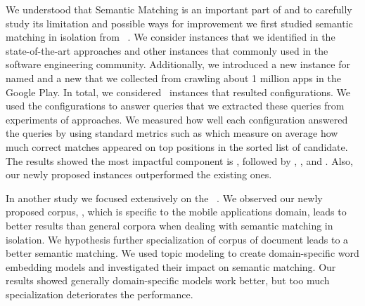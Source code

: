 \bigskip
We understood that Semantic Matching is an important part of \testreuse and to carefully study its limitation and possible ways for improvement we first studied semantic matching in isolation from \testreuse~\cite{mariani:SemFinder:ISSTA:2021}.  
We consider instances that we identified in the state-of-the-art \testreuse approaches and other instances that commonly used in the software engineering community. 
Additionally, we introduced a new instance for \sma named \tool and a new \corpus that we collected from crawling about 1 million apps in the Google Play.
In total, we considered \ninstances~instances that resulted \ncomb configurations.
We used the configurations to answer \nquery queries that we extracted these queries from experiments of \testreuse approaches.
We measured how well each configuration answered the queries by using standard metrics such as \mrr which measure on average how much correct matches appeared on top positions in the sorted list of candidate. 
The results showed the most impactful component is \sma, followed by \we, \ede, and \corpus. 
Also, our newly proposed instances outperformed the existing ones. 

\bigskip
In another study we focused extensively on the \corpus~\cite{khalili:DomainEmbedding:ICPC:2022}.
We observed our newly proposed corpus, \gp, which is specific to the mobile applications domain, leads to better results than general corpora when dealing with semantic matching in isolation.  
We hypothesis further specialization of corpus of document leads to a better semantic matching.  
We used topic modeling to create domain-specific word embedding models and investigated their impact on semantic matching.
Our results showed generally domain-specific models work better, but too much specialization deteriorates the performance.


